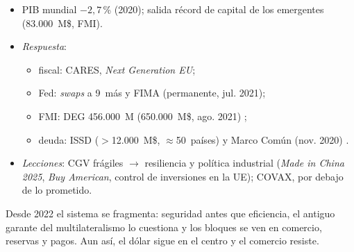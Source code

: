 \documentclass{article}
\begin{document}
\begin{columnas}
\begin{itemize}
\item PIB mundial $-2{,}7$\,\% (2020); salida récord de capital de los emergentes (83.000~M\$, FMI).
\item \emph{Respuesta}:
  \begin{itemize}
  \item fiscal: CARES, \emph{Next Generation EU};
  \item Fed: \emph{swaps} a 9~más y FIMA (permanente, jul. 2021);
  \item FMI: DEG 456.000~M (650.000~M\$, ago. 2021) ;
  \item deuda: ISSD ($>$12.000~M\$, $\approx$50~países) y Marco Común (nov. 2020) .
  \end{itemize}
\item \emph{Lecciones}: CGV frágiles $\to$ resiliencia y política industrial (\emph{Made in China 2025}, \emph{Buy American}, control de inversiones en la UE); COVAX, por debajo de lo prometido.
\end{itemize}

\begin{ideaclave}
Desde 2022 el sistema se fragmenta: seguridad antes que eficiencia, el antiguo garante del multilateralismo lo cuestiona y los bloques se ven en comercio, reservas y pagos. Aun así, el dólar sigue en el centro y el comercio resiste.
\end{ideaclave}


\end{columnas}
\end{document}
